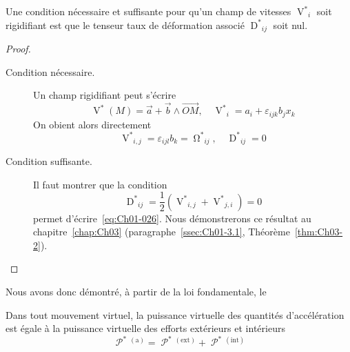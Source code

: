 \begin{lem}
    Une condition nécessaire et suffisante pour qu'un champ de vitesses $\displaystyle {\mathop{V}^{\ast}}_i$ soit rigidifiant est que le tenseur taux de déformation associé $\displaystyle {\mathop{D}^{\ast}}_{ij}$ soit nul.
    \label{lem:Ch01-3}
\end{lem}
\begin{proof}
    \begin{description}
        \item[Condition nécessaire.] Un champ rigidifiant peut s'écrire 
            \begin{equation}
                \mathop{V}^{\ast}(M) = \vec{a} + \vec{b} \wedge \vec{OM},\quad {\mathop{V}^{\ast}}_i = a_i + \varepsilon_{ijk} b_j x_k
                \label{eq:Ch01-026}
            \end{equation}
            On obient alors directement
            \begin{displaymath}
                {\mathop{V}^{\ast}}_{i,j} = \varepsilon_{ijl}b_k = {\mathop{\Omega}^{\ast}}_{ij},\quad {\mathop{D}^{\ast}}_{ij} = 0
            \end{displaymath}
        \item[Condition suffisante.] Il faut montrer que la condition
            \begin{equation}
                {\mathop{D}^{\ast}}_{ij} = \frac{1}{2} \left( {\mathop{V}^{\ast}}_{i,j} + {\mathop{V}^{\ast}}_{j,i} \right) = 0
                \label{eq:Ch01-027}
            \end{equation}
            permet d'écrire~\eqref{eq:Ch01-026}.
            Nous démonstrerons ce résultat au chapitre~\ref{chap:Ch03} (paragraphe~\ref{ssec:Ch01-3.1}, Théorème~\ref{thm:Ch03-2}).
    \end{description}
\end{proof}
Nous avons donc démontré, à partir de la loi fondamentale, le
\begin{thmn}
    Dans tout mouvement virtuel, la puissance virtuelle des quantités d'accélération est égale à la puissance virtuelle des efforts extérieurs et intérieurs
    \begin{equation}
        \mathop{\mathcal{P}}^{\ast}{\!}^{(\text{a})} = \mathop{\mathcal{P}}^{\ast}{\!}^{(\text{ext})} + \mathop{\mathcal{P}}^{\ast}{\!}^{(\text{int})}
        \label{eq:Ch01-028}
    \end{equation}
\end{thmn}

